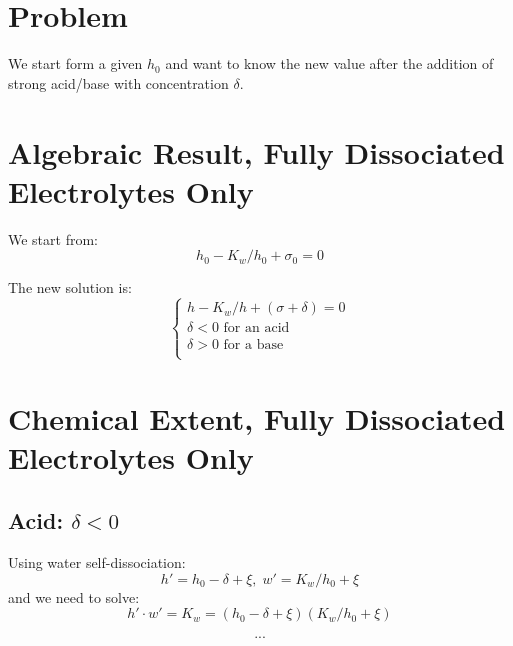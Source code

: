 \documentclass[aps,12pt]{revtex4}
\begin{document}
\section{Problem}

We start form a given $h_0$ and want to know the new value
after the addition of strong acid/base with concentration $\delta$.


\section{Algebraic Result, Fully Dissociated Electrolytes Only}

We start from:
\begin{equation}
h_0-K_w/h_0 + \sigma_0 = 0
\end{equation}

The new solution is:
\begin{equation}
\left\lbrace
\begin{array}{l}
h-K_w/h + (\sigma+\delta) = 0  \\
\text{$\delta<0$ for an acid} \\
\text{$\delta>0$ for a base} \\
\end{array}
\right.
\end{equation}

\section{Chemical Extent, Fully Dissociated Electrolytes Only}

\subsection{Acid: $\delta<0$}
Using water self-dissociation:
\begin{equation}
	h'=h_0-\delta+\xi,\;w'=K_w/h_0 + \xi
\end{equation}
and we need to solve:
\begin{equation}
	h' \cdot w' = K_w = (h_0-\delta+\xi) (K_w/h_0 + \xi)
\end{equation}

\begin{equation}
 ...
\end{equation}
\end{document}
